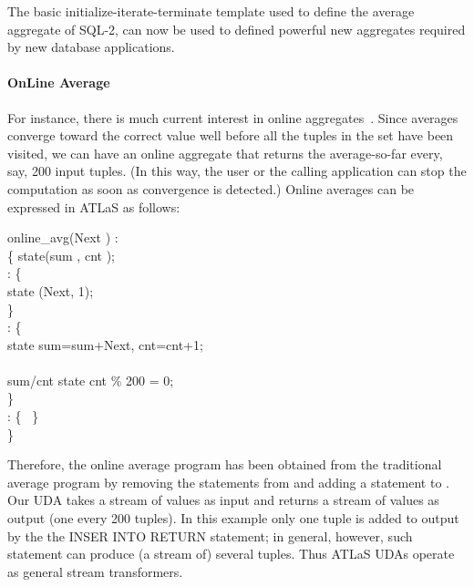 The basic initialize-iterate-terminate template used to define the
average aggregate of SQL-2, can now be used to defined powerful
new aggregates required by new database applications.

\paragraph{OnLine Average}For instance, there is much current interest in online
aggregates~\cite{hellerstein}. Since averages converge toward the correct
value well before all the tuples in the set have been visited, we
can have an online aggregate that returns the average-so-far
every, say, 200 input tuples. (In this way, the user or the
calling application can stop the computation as soon as
convergence is detected.) Online averages can be expressed in
ATLaS as follows:

\begin{codedisplay}
\> online\_avg(Next ) : \\
\>\{\> state(sum , cnt ); \\
\>\>  : \{ \\
\>\>\>  state  (Next, 1);\\
\> \> \} \\
\>\> : \{ \\
\>\>\>  state  sum=sum+Next, cnt=cnt+1;\\
\>\>\>   \\
\>\> \>  sum/cnt  state  cnt \% 200 = 0; \\
\>\>\}\\
\>\> : \{  \ \}\\
\>\}\\
\end{codedisplay}

Therefore, the online average program has been obtained from the
traditional average program by removing the statements from
{} and adding a {} statement to
{}.  Our UDA {} takes a
stream of values as input and returns a stream of values as output
(one every 200 tuples). In this example only one tuple is
added to output by the  the {\small
{INSER INTO RETURN}} statement; in general, however, such statement can produce
(a stream of) several tuples. Thus ATLaS UDAs operate as
general stream transformers.

